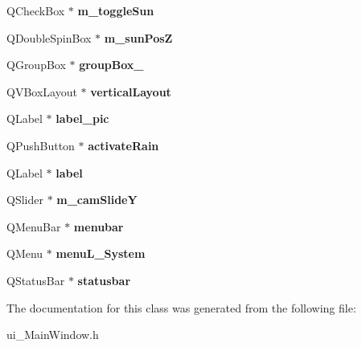 \begin{DoxyCompactItemize}
\item 
\hypertarget{classUi__MainWindow_a0dee78c4717cb398280fb2ebfe9027c1}{
QCheckBox $\ast$ {\bfseries m\_\-toggleSun}}
\label{classUi__MainWindow_a0dee78c4717cb398280fb2ebfe9027c1}

\item 
\hypertarget{classUi__MainWindow_a17cb1afd4cf9c15f0593d24f82db8523}{
QDoubleSpinBox $\ast$ {\bfseries m\_\-sunPosZ}}
\label{classUi__MainWindow_a17cb1afd4cf9c15f0593d24f82db8523}

\item 
\hypertarget{classUi__MainWindow_a1a1fe5ec77ba52ba39a16db29ff0f91a}{
QGroupBox $\ast$ {\bfseries groupBox\_}}
\label{classUi__MainWindow_a1a1fe5ec77ba52ba39a16db29ff0f91a}

\item 
\hypertarget{classUi__MainWindow_aecd96a04789fcfec3f98d80390ad8184}{
QVBoxLayout $\ast$ {\bfseries verticalLayout}}
\label{classUi__MainWindow_aecd96a04789fcfec3f98d80390ad8184}

\item 
\hypertarget{classUi__MainWindow_a7e072751261e445549aa404c46433145}{
QLabel $\ast$ {\bfseries label\_\-pic}}
\label{classUi__MainWindow_a7e072751261e445549aa404c46433145}

\item 
\hypertarget{classUi__MainWindow_affed7a3efc052f3c97728f52b1b63ec7}{
QPushButton $\ast$ {\bfseries activateRain}}
\label{classUi__MainWindow_affed7a3efc052f3c97728f52b1b63ec7}

\item 
\hypertarget{classUi__MainWindow_ad9c89133780f28e6efa2ec17ceb9cff5}{
QLabel $\ast$ {\bfseries label}}
\label{classUi__MainWindow_ad9c89133780f28e6efa2ec17ceb9cff5}

\item 
\hypertarget{classUi__MainWindow_a13394e268ac8560b1d6c9688cb2abd84}{
QSlider $\ast$ {\bfseries m\_\-camSlideY}}
\label{classUi__MainWindow_a13394e268ac8560b1d6c9688cb2abd84}

\item 
\hypertarget{classUi__MainWindow_adf43d9a67adaec750aaa956b5e082f09}{
QMenuBar $\ast$ {\bfseries menubar}}
\label{classUi__MainWindow_adf43d9a67adaec750aaa956b5e082f09}

\item 
\hypertarget{classUi__MainWindow_a9c0aed98469b12e03c33895c2bbae95f}{
QMenu $\ast$ {\bfseries menuL\_\-System}}
\label{classUi__MainWindow_a9c0aed98469b12e03c33895c2bbae95f}

\item 
\hypertarget{classUi__MainWindow_a1687cceb1e2787aa1f83e50433943a91}{
QStatusBar $\ast$ {\bfseries statusbar}}
\label{classUi__MainWindow_a1687cceb1e2787aa1f83e50433943a91}

\end{DoxyCompactItemize}


The documentation for this class was generated from the following file:\begin{DoxyCompactItemize}
\item 
ui\_\-MainWindow.h\end{DoxyCompactItemize}

